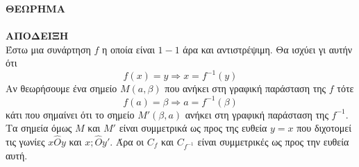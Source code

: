\textbf{ΘΕΩΡΗΜΑ}\\
\\
\textbf{ΑΠΟΔΕΙΞΗ}\\
Έστω μια συνάρτηση $ f $ η οποία είναι $ 1-1 $ άρα και αντιστρέψιμη. Θα ισχύει γι αυτήν ότι
\[ f(x)=y\Rightarrow x=f^{-1}(y) \]
Αν θεωρήσουμε ένα σημείο $ M(a,\beta) $ που ανήκει στη γραφική παράσταση της $ f $ τότε
\[ f(a)=\beta\Rightarrow a=f^{-1}(\beta) \]
κάτι που σημαίνει ότι το σημείο $ M'(\beta,a) $ ανήκει στη γραφική παράσταση της $ f^{-1} $. Τα σημεία όμως $ M $ και $ M' $ είναι συμμετρικά ως προς της ευθεία $ y=x $ που διχοτομεί τις γωνίες $ x\hat{O}y $ και $ x;\hat{O}y' $. Άρα οι $ C_f $ και $ C_{f^{-1}} $ είναι συμμετρικές ως προς την ευθεία αυτή.


